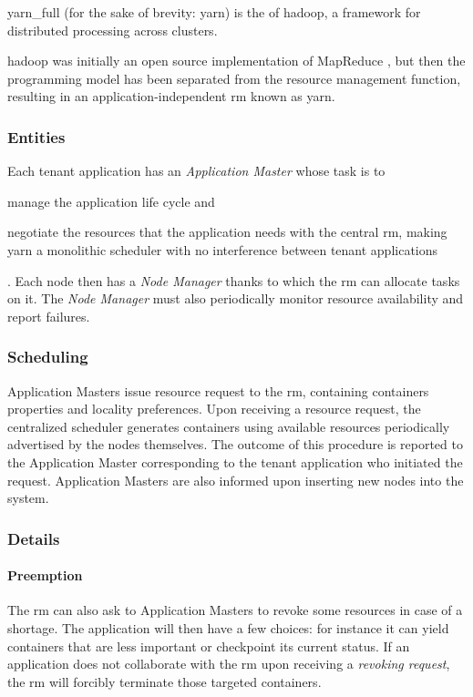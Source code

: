 \glsdesc{yarn_full} (for the sake of brevity: \glsdesc{yarn}) is the  of \glsdesc{hadoop}, a framework for distributed processing across clusters.

\glsdesc{hadoop} was initially an open source implementation of MapReduce \cite{mapreduce}, but then the programming model has been separated from the resource management function, resulting in an application-independent \gls{rm} known as \glsdesc{yarn}.

\subsubsection{Entities}
Each tenant application has an \textit{Application Master} whose task is to
\begin{mylist}
    \item manage the application life cycle and
    \item negotiate the resources that the application needs with the central \gls{rm}, making \glsdesc{yarn} a monolithic scheduler with no interference between tenant applications
\end{mylist}.
Each node then has a \textit{Node Manager} thanks to which the \gls{rm} can allocate tasks on it.
The \textit{Node Manager} must also periodically monitor resource availability and report failures.

\subsubsection{Scheduling}
Application Masters issue resource request to the \gls{rm}, containing containers properties and locality preferences.
Upon receiving a resource request, the centralized scheduler generates containers using available resources periodically advertised by the nodes themselves.
The outcome of this procedure is reported to the Application Master corresponding to the tenant application who initiated the request.
Application Masters are also informed upon inserting new nodes into the system.

\subsubsection{Details}
\paragraph{Preemption}
The \gls{rm} can also ask to Application Masters to revoke some resources in case of a shortage.
The application will then have a few choices: for instance it can yield containers that are less important or checkpoint its current status.
If an application does not collaborate with the \gls{rm} upon receiving a \textit{revoking request}, the \gls{rm} will forcibly terminate those targeted containers.
